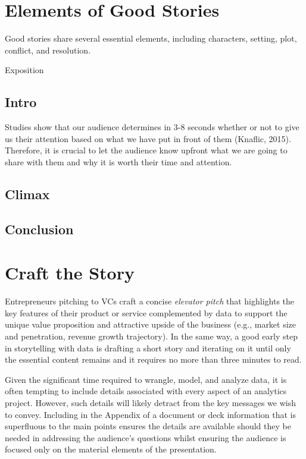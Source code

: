\documentclass[
]{book}
\begin{document}
\hypertarget{elements-of-good-stories}{%
\section{Elements of Good Stories}\label{elements-of-good-stories}}

Good stories share several essential elements, including characters, setting, plot, conflict, and resolution.

Exposition

\hypertarget{intro}{%
\subsection{Intro}\label{intro}}

Studies show that our audience determines in 3-8 seconds whether or not to give us their attention based on what we have put in front of them (Knaflic, 2015). Therefore, it is crucial to let the audience know upfront what we are going to share with them and why it is worth their time and attention.

\hypertarget{climax}{%
\subsection{Climax}\label{climax}}

\hypertarget{conclusion}{%
\subsection{Conclusion}\label{conclusion}}

\hypertarget{craft-the-story}{%
\section{Craft the Story}\label{craft-the-story}}

Entrepreneurs pitching to VCs craft a concise \emph{elevator pitch} that highlights the key features of their product or service complemented by data to support the unique value proposition and attractive upside of the business (e.g., market size and penetration, revenue growth trajectory). In the same way, a good early step in storytelling with data is drafting a short story and iterating on it until only the essential content remains and it requires no more than three minutes to read.

Given the significant time required to wrangle, model, and analyze data, it is often tempting to include details associated with every aspect of an analytics project. However, such details will likely detract from the key messages we wish to convey. Including in the Appendix of a document or deck information that is superfluous to the main points ensures the details are available should they be needed in addressing the audience's questions whilst ensuring the audience is focused only on the material elements of the presentation.
\end{document}
